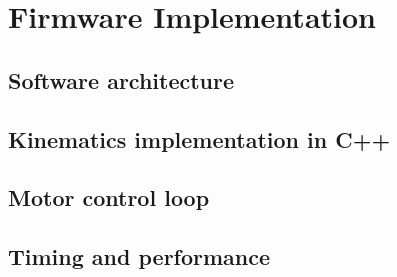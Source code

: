 \chapter{Firmware Implementation}
\label{ch:firmware}

\section{Software architecture}

\section{Kinematics implementation in C++}

\section{Motor control loop}

\section{Timing and performance}

